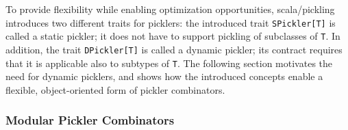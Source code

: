 \documentclass[10pt]{sigplanconf}
\theoremstyle{definition}
\theoremstyle{definition}
\newcommand{\term}[1]{\mbox{\texttt{#1}}}
\begin{document}
To provide flexibility while enabling optimization opportunities,
scala/pickling introduces two different traits for picklers: the introduced
trait \verb|SPickler[T]| is called a static pickler; it does not have to
support pickling of subclasses of \verb|T|. In addition, the trait
\verb|DPickler[T]| is called a dynamic pickler; its contract requires that it
is applicable also to subtypes of \verb|T|. The following section motivates
the need for dynamic picklers, and shows how the introduced concepts enable a
flexible, object-oriented form of pickler combinators.








\subsubsection{Modular Pickler Combinators}

\end{document}
